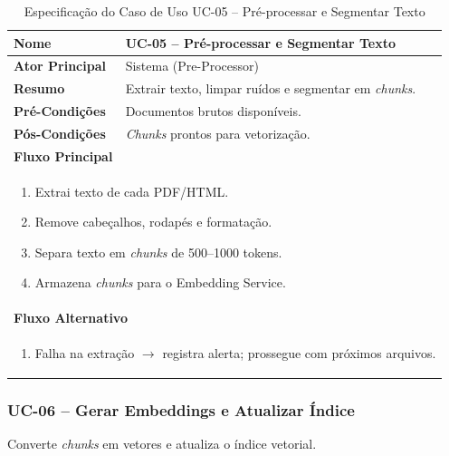 \begin{table}[H]
\centering
\caption{Especificação do Caso de Uso UC-05 – Pré-processar e Segmentar Texto}
\label{tab:uc05}
\begin{tabular}{|p{4cm}|p{11cm}|}
\hline
\textbf{Nome}        & UC-05 – Pré-processar e Segmentar Texto \\ \hline
\textbf{Ator Principal} & Sistema (Pre-Processor) \\ \hline
\textbf{Resumo}      & Extrair texto, limpar ruídos e segmentar em \textit{chunks}. \\ \hline
\textbf{Pré-Condições} & Documentos brutos disponíveis. \\ \hline
\textbf{Pós-Condições} & \textit{Chunks} prontos para vetorização. \\ \hline
\multicolumn{2}{|l|}{\textbf{Fluxo Principal}} \\ \hline
\multicolumn{2}{|p{15cm}|}{%
\begin{enumerate}[leftmargin=*]
  \item Extrai texto de cada PDF/HTML.
  \item Remove cabeçalhos, rodapés e formatação.
  \item Separa texto em \textit{chunks} de 500–1000 tokens.
  \item Armazena \textit{chunks} para o Embedding Service.
\end{enumerate}} \\ \hline
\multicolumn{2}{|l|}{\textbf{Fluxo Alternativo}} \\ \hline
\multicolumn{2}{|p{15cm}|}{%
\begin{enumerate}[label=\arabic*a.,leftmargin=*]
  \item Falha na extração $\rightarrow$ registra alerta; prossegue com próximos arquivos.
\end{enumerate}} \\ \hline
\end{tabular}
\end{table}

\subsubsection{UC-06 – Gerar Embeddings e Atualizar Índice}

\noindent
Converte \textit{chunks} em vetores e atualiza o índice vetorial.

